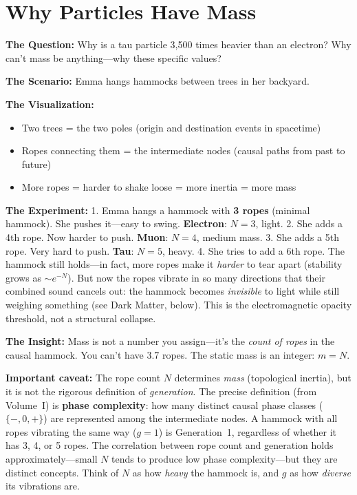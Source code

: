 \documentclass[11pt, a4paper, openany]{book}
\begin{document}
\section{Why Particles Have Mass}
\begin{thoughtexp}
\textbf{The Question:} Why is a tau particle 3,500 times heavier than an electron? Why can't mass be anything---why these specific values?

\textbf{The Scenario:} Emma hangs hammocks between trees in her backyard.

\textbf{The Visualization:}
\begin{itemize}
  \item Two trees = the two poles (origin and destination events in spacetime)
  \item Ropes connecting them = the intermediate nodes (causal paths from past to future)
  \item More ropes = harder to shake loose = more inertia = more mass
\end{itemize}

\textbf{The Experiment:}
1. Emma hangs a hammock with \textbf{3 ropes} (minimal hammock). She pushes it---easy to swing. \textbf{Electron}: $N=3$, light.
2. She adds a 4th rope. Now harder to push. \textbf{Muon}: $N=4$, medium mass.
3. She adds a 5th rope. Very hard to push. \textbf{Tau}: $N=5$, heavy.
4. She tries to add a 6th rope. The hammock still holds---in fact, more ropes make it \emph{harder} to tear apart (stability grows as $\sim e^{-N}$). But now the ropes vibrate in so many directions that their combined sound cancels out: the hammock becomes \emph{invisible} to light while still weighing something (see Dark Matter, below). This is the electromagnetic opacity threshold, not a structural collapse.

\textbf{The Insight:} Mass is not a number you assign---it's the \emph{count of ropes} in the causal hammock. You can't have 3.7 ropes. The static mass is an integer: $m = N$.

\textbf{Important caveat:} The rope count $N$ determines \emph{mass} (topological inertia), but it is not the rigorous definition of \emph{generation}. The precise definition (from Volume~I) is \textbf{phase complexity}: how many distinct causal phase classes ($\{-, 0, +\}$) are represented among the intermediate nodes. A hammock with all ropes vibrating the same way ($g = 1$) is Generation~1, regardless of whether it has 3, 4, or 5 ropes. The correlation between rope count and generation holds approximately---small $N$ tends to produce low phase complexity---but they are distinct concepts. Think of $N$ as how \emph{heavy} the hammock is, and $g$ as how \emph{diverse} its vibrations are.


\end{thoughtexp}
\end{document}
